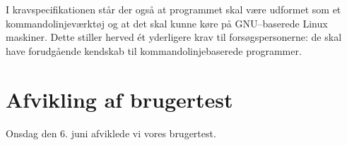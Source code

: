 \documentclass[a4paper,oneside,article]{memoir}
\begin{document}
I kravspecifikationen står der også at programmet skal være udformet
som et kommandolinjeværktøj og at det skal kunne køre på GNU--baserede
Linux maskiner. Dette stiller herved ét yderligere krav til
forsøgspersonerne: de skal have forudgående kendskab til
kommando\-linje\-baserede programmer.

\section{Afvikling af brugertest}
Onsdag den 6. juni afviklede vi vores brugertest.
\end{document}
